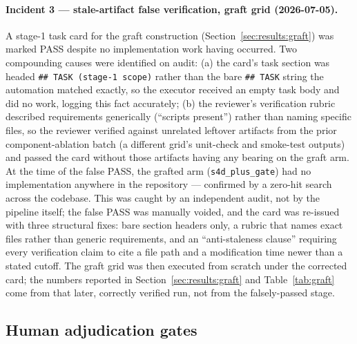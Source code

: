 \documentclass[11pt]{article}
\begin{document}
\paragraph{Incident 3 --- stale-artifact false verification, graft grid (2026-07-05).} A stage-1 task card for the graft construction (Section~\ref{sec:results:graft}) was marked PASS despite no implementation work having occurred. Two compounding causes were identified on audit: (a) the card's task section was headed \texttt{\#\# TASK (stage-1 scope)} rather than the bare \texttt{\#\# TASK} string the automation matched exactly, so the executor received an empty task body and did no work, logging this fact accurately; (b) the reviewer's verification rubric described requirements generically (``scripts present'') rather than naming specific files, so the reviewer verified against unrelated leftover artifacts from the prior component-ablation batch (a different grid's unit-check and smoke-test outputs) and passed the card without those artifacts having any bearing on the graft arm. At the time of the false PASS, the grafted arm (\texttt{s4d\_plus\_gate}) had no implementation anywhere in the repository --- confirmed by a zero-hit search across the codebase. This was caught by an independent audit, not by the pipeline itself; the false PASS was manually voided, and the card was re-issued with three structural fixes: bare section headers only, a rubric that names exact files rather than generic requirements, and an ``anti-staleness clause'' requiring every verification claim to cite a file path and a modification time newer than a stated cutoff. The graft grid was then executed from scratch under the corrected card; the numbers reported in Section~\ref{sec:results:graft} and Table~\ref{tab:graft} come from that later, correctly verified run, not from the falsely-passed stage.

\subsection{Human adjudication gates}
\end{document}
